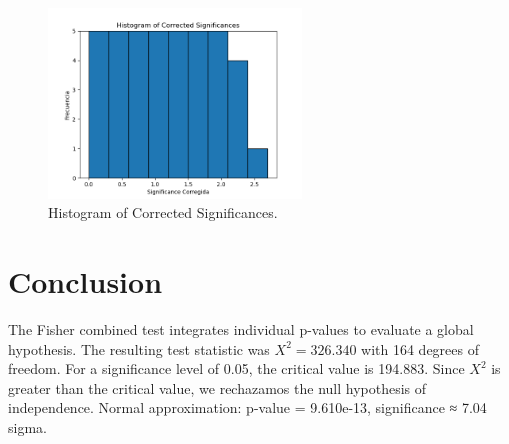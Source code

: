 \documentclass[12pt]{article}
\begin{document}
\begin{figure}[h!]
\centering
\includegraphics[width=0.6\textwidth]{corrected_significance_hist.png}
\caption{Histogram of Corrected Significances.}
\end{figure}

\section*{Conclusion}
The Fisher combined test integrates individual p-values to evaluate a global hypothesis.
The resulting test statistic was $X^2 = 326.340$ with 164 degrees of freedom.
For a significance level of 0.05, the critical value is 194.883.
Since $X^2$ is greater than the critical value, we rechazamos the null hypothesis of independence.
Normal approximation: p-value = 9.610e-13, significance ≈ 7.04 sigma.
\end{document}
